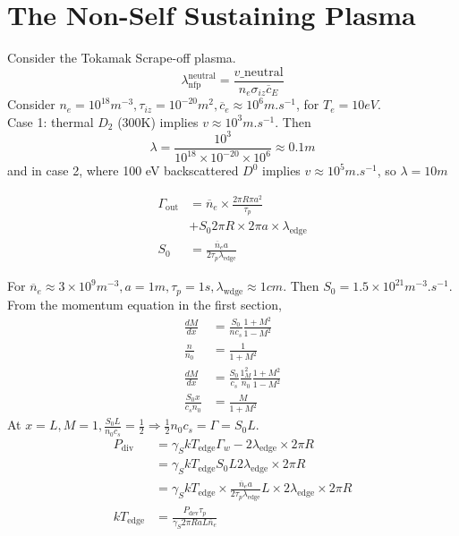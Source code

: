 \documentclass[12pt]{article}
\begin{document}
\section{The Non-Self Sustaining Plasma}

Consider the Tokamak Scrape-off plasma.
$$\lambda^{\text{neutral}}_{\text{nfp}} = \frac{v\_{\text{neutral}}}{n_e\sigma_{iz}\overline c_E}$$
Consider $n_e  =10^{18}\unit{m^{-3}}, \tau_{iz} = 10^{-20}\unit{m^2}, \overline c_e \approx 10^6 \unit{m.s^{-1}}$, for $T_e = 10\unit{eV}$. \\
Case 1: thermal $D_2$ (300K) implies $v \approx 10^3 \unit{m.s^{-1}}$. Then
$$\lambda = \frac{10^3}{10^{18}\times10^{-20}\times10^6} \approx 0.1\unit{m}$$
and in case 2, where 100 eV backscattered $D^0$ implies $v \approx 10^5\unit{m.s^{-1}}$, so $\lambda = 10\unit{m}$

\begin{align*}
    \Gamma_{\text{out}} &= \overline n_e \times \frac{2\pi R \pi a^2}{\tau_p} \\
                        &+ S_0 2\pi R \times 2\pi a \times \lambda_{\text{edge}} \\
    S_0 &= \frac{\overline n_e a}{2\tau_p\lambda_{\text{edge}}}
\end{align*}

\begin{ex}[JET]
    For $\overline n_e \approx 3 \times 10^9\unit{m^{-3}}, a = 1\unit{m}, \tau_p = 1\unit{s}, \lambda_{\text{wdge}} \approx 1\unit{cm}$. Then $S_0 = 1.5 \times 10^{21}\unit{m^{-3}.s^{-1}}$. From the momentum equation in the first section,
    \begin{align*}
        \frac{dM}{dx} &= \frac{S_0}{nc_s} \frac{1+M^2}{1-M^2} \\
        \frac{n}{n_0} &= \frac{1}{1+M^2} \\
        \frac{dM}{dx} &= \frac{S_0}{c_s} \frac{1_M^2}{n_0} \frac{1+M^2}{1-M^2} \\
        \frac{S_0x}{c_sn_0} &= \frac{M}{1+M^2}
    \end{align*}
    At $x=L, M=1, \frac{S_0L}{n_0c_s} = \frac{1}{2} \Rightarrow \frac{1}{2} n_0c_s = \Gamma = S_0L$.
    \begin{align*}
        P_{\text{div}} &= \gamma_S kT_{\text{edge}}\Gamma_w - 2\lambda_{\text{edge}} \times 2\pi R \\
                       &= \gamma_S kT_{\text{edge}}S_0L 2\lambda_{\text{edge}} \times 2\pi R \\
                       &= \gamma_S kT_{\text{edge}} \times \frac{\overline n_ea}{2\tau_p\lambda_{\text{edge}}} L \times 2\lambda_{\text{edge}} \times 2\pi R \\
        kT_{\text{edge}} &= \frac{P_{\text{dev}}\tau_p}{\gamma_S 2\pi RaL\overline n_e}
    \end{align*}
\end{ex}
\end{document}
